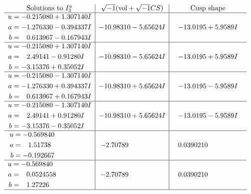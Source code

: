 \documentclass[1p]{elsarticle_modified}
\theoremstyle{definition}
\newcommand{\I}{\sqrt{-1}}
\begin{document}
$$\begin{array}{c|c|c}  
\text{Solutions to }I^u_{3}& \I (\text{vol} + \sqrt{-1}CS) & \text{Cusp shape}\\
 \hline 
\begin{aligned}
u &= -0.215080 + 1.307140 I \\
a &= -1.276330 - 0.394337 I \\
b &= \phantom{-}0.613967 - 0.167943 I\end{aligned}
 & -10.98310 - 5.65624 I & -13.0195 + 5.9589 I \\ \hline\begin{aligned}
u &= -0.215080 + 1.307140 I \\
a &= \phantom{-}2.49141 - 0.91280 I \\
b &= -3.15376 + 0.35052 I\end{aligned}
 & -10.98310 - 5.65624 I & -13.0195 + 5.9589 I \\ \hline\begin{aligned}
u &= -0.215080 - 1.307140 I \\
a &= -1.276330 + 0.394337 I \\
b &= \phantom{-}0.613967 + 0.167943 I\end{aligned}
 & -10.98310 + 5.65624 I & -13.0195 - 5.9589 I \\ \hline\begin{aligned}
u &= -0.215080 - 1.307140 I \\
a &= \phantom{-}2.49141 + 0.91280 I \\
b &= -3.15376 - 0.35052 I\end{aligned}
 & -10.98310 + 5.65624 I & -13.0195 - 5.9589 I \\ \hline\begin{aligned}
u &= -0.569840\phantom{ +0.000000I} \\
a &= \phantom{-}1.51738\phantom{ +0.000000I} \\
b &= -0.192667\phantom{ +0.000000I}\end{aligned}
 & -2.70789\phantom{ +0.000000I} & \phantom{-}0.0390210\phantom{ +0.000000I} \\ \hline\begin{aligned}
u &= -0.569840\phantom{ +0.000000I} \\
a &= \phantom{-}0.0524558\phantom{ +0.000000I} \\
b &= \phantom{-}1.27226\phantom{ +0.000000I}\end{aligned}
 & -2.70789\phantom{ +0.000000I} & \phantom{-}0.0390210\phantom{ +0.000000I}\\
 \hline 
 \end{array}$$\newpage\newpage\renewcommand{\arraystretch}{1}
\end{document}
